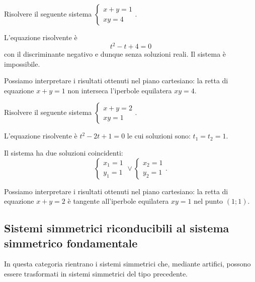 \begin{esempio}{}{}
Risolvere il seguente sistema 
\(\left\{\begin{array}{l}{x+y=1}\\{xy=4}\end{array}\right.\).
\begin{htmulticols}{2}
L'equazione risolvente è \[ t^2-t+4=0 \] con il discriminante negativo e dunque 
senza soluzioni reali. Il sistema è impossibile.

Possiamo interpretare i risultati ottenuti nel piano cartesiano: la retta di 
equazione \(x+y=1\) non interseca l'iperbole equilatera \({xy}=4\).
\begin{center}

\end{center}
\end{htmulticols}
\end{esempio}
\newpage
\begin{esempio}{}{}
Risolvere il seguente sistema \(\left\{\begin{array}{l}{x+y=2}\\{xy=1}\end{array}\right.\).
\begin{htmulticols}{2}
L'equazione risolvente è \(t^2-2t+1=0\) le cui soluzioni sono: \(t_1=t_2=1\).

Il sistema ha due soluzioni coincidenti: \[ \left\{\begin{array}{l}{x_1=1}\\{y_1=1}\end{array}\right.\vee \left\{\begin{array}{l}{x_2=1}\\{y_2=1}\end{array}\right.. \]

Possiamo interpretare i risultati ottenuti nel piano cartesiano: la retta di equazione \(x+y=2\) è tangente all'iperbole equilatera \(xy=1\) nel punto \((1;1)\).
\begin{center}

\end{center}
\end{htmulticols}
\end{esempio}


\subsection{Sistemi simmetrici riconducibili al sistema simmetrico fondamentale}
In questa categoria rientrano i sistemi simmetrici che, mediante artifici, 
possono essere trasformati in sistemi simmetrici del tipo precedente.

